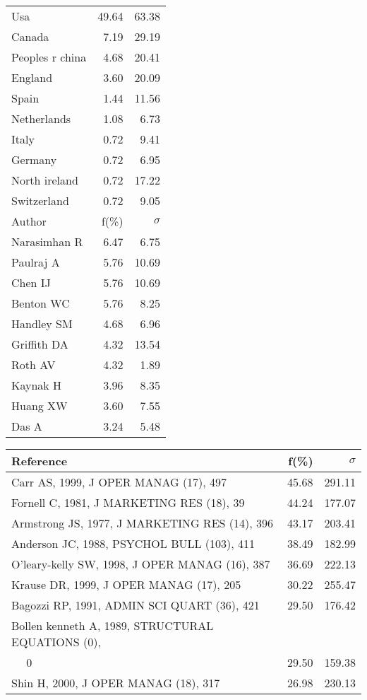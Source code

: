 \documentclass[a4paper,11pt]{report}
\begin{document}
\begin{landscape}
\begin{table}[!ht]
{\begin{tabular}{|l r r|}
\hline
Usa & 49.64 & 63.38\\
Canada & 7.19 & 29.19\\
Peoples r china & 4.68 & 20.41\\
England & 3.60 & 20.09\\
Spain & 1.44 & 11.56\\
Netherlands & 1.08 & 6.73\\
Italy & 0.72 & 9.41\\
Germany & 0.72 & 6.95\\
North ireland & 0.72 & 17.22\\
Switzerland & 0.72 & 9.05\\
\hline
\hline
Author & f(\%) & $\sigma$\\
\hline
Narasimhan R & 6.47 & 6.75\\
Paulraj A & 5.76 & 10.69\\
Chen IJ & 5.76 & 10.69\\
Benton WC & 5.76 & 8.25\\
Handley SM & 4.68 & 6.96\\
Griffith DA & 4.32 & 13.54\\
Roth AV & 4.32 & 1.89\\
Kaynak H & 3.96 & 8.35\\
Huang XW & 3.60 & 7.55\\
Das A & 3.24 & 5.48\\
\hline
\end{tabular}
}
{\scriptsize\begin{tabular}{|l r r|}
\hline
Reference & f(\%) & $\sigma$\\
\hline
Carr AS, 1999, J OPER MANAG (17), 497 & 45.68 & 291.11\\
Fornell C, 1981, J MARKETING RES (18), 39 & 44.24 & 177.07\\
Armstrong JS, 1977, J MARKETING RES (14), 396 & 43.17 & 203.41\\
Anderson JC, 1988, PSYCHOL BULL (103), 411 & 38.49 & 182.99\\
O'leary-kelly SW, 1998, J OPER MANAG (16), 387 & 36.69 & 222.13\\
Krause DR, 1999, J OPER MANAG (17), 205 & 30.22 & 255.47\\
Bagozzi RP, 1991, ADMIN SCI QUART (36), 421 & 29.50 & 176.42\\
Bollen kenneth A, 1989, STRUCTURAL EQUATIONS (0), &  & \\
$\quad$ 0 & 29.50 & 159.38\\
Shin H, 2000, J OPER MANAG (18), 317 & 26.98 & 230.13\\

\end{tabular}}
\end{table}
\end{landscape}
\end{document}
